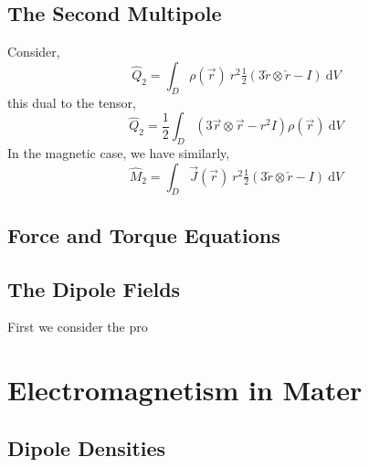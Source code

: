 \documentclass[12pt]{extarticle}
\renewcommand{\d}[1]{ \mathrm{d}#1 \:}
\theoremstyle{definition}
\begin{document}
\subsection{The Second Multipole}
Consider,
\[ \hat{Q}_2 = \int_D \rho(\vec{r})\: r^2 \tfrac{1}{2} (3 \check{r} \otimes \check{r} - I) \: \d{V} \]
this dual to the tensor,
\[ \hat{Q}_2 = \frac{1}{2} \int_D  (3 \vec{r} \otimes \vec{r} - r^2 I) \rho(\vec{r}) \: \d{V} \]
In the magnetic case, we have similarly,
\[ \hat{M}_2 = \int_D \vec{J}(\vec{r})\: r^2 \tfrac{1}{2} (3 \check{r} \otimes \check{r} - I) \: \d{V} \]

\subsection{Force and Torque Equations} 



\subsection{The Dipole Fields}


First we consider the pro



\section{Electromagnetism in Mater}

\subsection{Dipole Densities}
\end{document}
